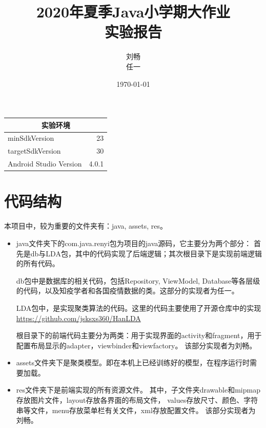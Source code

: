 \documentclass[UTF8]{article}
\title{2020年夏季Java小学期大作业\\ 实验报告} %
\author{刘畅 \quad 2018011315 \\任一  \quad 2018011423 } %
\date{\today} %
\begin{document}
\maketitle %
\begin{center}
    \begin{tabular}{l  r}
    \hline
        \multicolumn{2}{c}{实验环境} \\ \hline
        minSdkVersion & 23 \\ \hline
        targetSdkVersion & 30 \\ \hline
        Android Studio Version&  4.0.1 \\ \hline

    \end{tabular}
\end{center}
\newpage
\section{代码结构}
本项目中，较为重要的文件夹有：java, assets, res。
\begin{itemize}
    \item {
        java文件夹下的com.java.renyi包为项目的java源码，它主要分为两个部分：
首先是db与LDA包，其中的代码实现了后端逻辑；其次根目录下是实现前端逻辑的所有代码。\newline
        
        db包中是数据库的相关代码，包括Repository, ViewModel, Database等各层级的代码，以及知疫学者和各国疫情数据的类。这部分的实现者为任一。

        LDA包中，是实现聚类算法的代码。这里的代码主要使用了开源仓库中的实现\url{https://github.com/jsksxs360/HanLDA}

        根目录下的前端代码主要分为两类：用于实现界面的activity和fragment，用于配置布局显示的adapter，viewbinder和viewfactory。
        该部分实现者为刘畅。
    }
    \item {
        assets文件夹下是聚类模型。即在本机上已经训练好的模型，在程序运行时需要加载。
    }
    \item {
        res文件夹下是前端实现的所有资源文件。
        其中，子文件夹drawable和mipmap存放图片文件，layout存放各界面的布局文件，
        values存放尺寸、颜色、字符串等文件，menu存放菜单栏有关文件，xml存放配置文件。
        该部分实现者为刘畅。
    }
\end{itemize}
\end{document}
